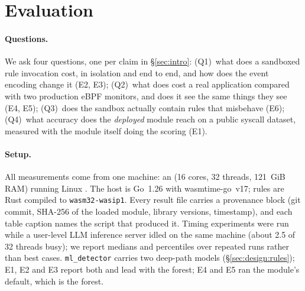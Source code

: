 \section{Evaluation}
\label{sec:eval}

\paragraph{Questions.}
We ask four questions, one per claim in \S\ref{sec:intro}:
(Q1)~what does a sandboxed rule invocation cost, in isolation and end to end,
and how does the event encoding change it (E2, E3);
(Q2)~what does \sys cost a real application compared with two production
eBPF monitors, and does it see the same things they see (E4, E5);
(Q3)~does the sandbox actually contain rules that misbehave (E6);
(Q4)~what accuracy does the \emph{deployed} module reach on a public
syscall dataset, measured with the module itself doing the scoring (E1).

\paragraph{Setup.}
All measurements come from one machine: an \provCpu{} (16 cores, 32 threads,
\SI{121}{GiB} RAM) running Linux \provKernel{}. The host is Go~1.26 with
wasmtime-go~v17; rules are Rust compiled to \texttt{wasm32-wasip1}. Every
result file carries a provenance block (git commit, SHA-256 of the loaded
module, library versions, timestamp), and each table caption names the
script that produced it. Timing experiments were run while a user-level LLM
inference server idled on the same machine (about 2.5 of 32 threads busy);
we report medians and percentiles over repeated runs rather than best cases.
\texttt{ml\_detector} carries two deep-path models (\S\ref{sec:design:rules});
E1, E2 and E3 report both and lead with the forest; E4 and E5 ran the
module's default, which is the forest.

